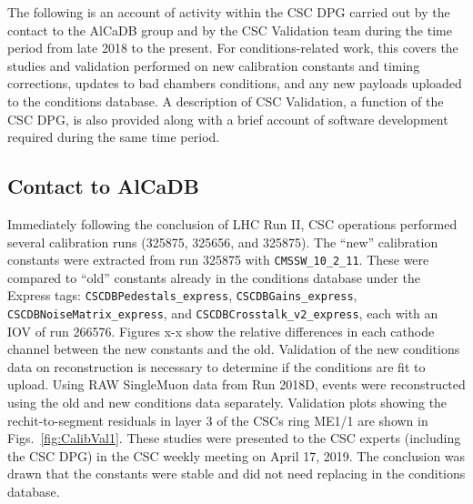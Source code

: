 
The following is an account of activity within the CSC DPG carried out by the contact to the AlCaDB group and by the CSC Validation team during the time period from late 2018 to the present. For conditions-related work, this covers the studies and validation performed on new calibration constants and timing corrections, updates to bad chambers conditions, and any new payloads uploaded to the conditions database. A description of CSC Validation, a function of the CSC DPG, is also provided along with a brief account of software development required during the same time period.

\subsection{Contact to AlCaDB}

Immediately following the conclusion of LHC Run II, CSC operations performed several calibration runs (325875, 325656, and 325875). The ``new'' calibration constants were extracted from run 325875 with \texttt{CMSSW\_10\_2\_11}. These were compared to ``old'' constants already in the conditions database under the Express tags: \texttt{CSCDBPedestals\_express}, \texttt{CSCDBGains\_express}, \texttt{CSCDBNoiseMatrix\_express}, and \texttt{CSCDBCrosstalk\_v2\_express}, each with an IOV of run 266576. Figures x-x show the relative differences in each cathode channel between the new constants and the old. Validation of the new conditions data on reconstruction is necessary to determine if the conditions are fit to upload. Using RAW SingleMuon data from Run 2018D, events were reconstructed using the old and new conditions data separately. Validation plots showing the rechit-to-segment residuals in layer 3 of the CSCs ring ME1/1 are shown in Figs.~\ref{fig:CalibVal1}. These studies were presented to the CSC experts (including the CSC DPG) in the CSC weekly meeting on April 17, 2019. The conclusion was drawn that the constants were stable and did not need replacing in the conditions database. 

